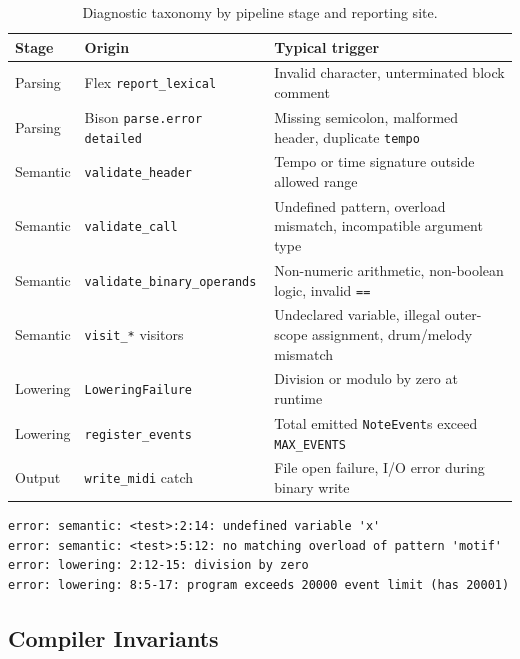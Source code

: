 \begin{table}[htbp]
  \centering
  \renewcommand{\arraystretch}{1.25}
  \begin{tabularx}{\textwidth}{@{}M{1.8cm} M{3.6cm} >{\raggedright\arraybackslash\hspace{0pt}}X@{}}
    \toprule
    \textbf{Stage} & \textbf{Origin} & \textbf{Typical trigger} \\
    \midrule
    Parsing & Flex \texttt{report\_lexical} & Invalid character, unterminated block comment \\
    Parsing & Bison \texttt{parse.error detailed} & Missing semicolon, malformed header, duplicate \texttt{tempo} \\
    Semantic & \texttt{validate\_header} & Tempo or time signature outside allowed range \\
    Semantic & \texttt{validate\_call} & Undefined pattern, overload mismatch, incompatible argument type \\
    Semantic & \texttt{validate\_binary\_operands} & Non-numeric arithmetic, non-boolean logic, invalid \texttt{==} \\
    Semantic & \texttt{visit\_*} visitors & Undeclared variable, illegal outer-scope assignment, drum/melody mismatch \\
    Lowering & \texttt{LoweringFailure} & Division or modulo by zero at runtime \\
    Lowering & \texttt{register\_events} & Total emitted \texttt{NoteEvent}s exceed \texttt{MAX\_EVENTS} \\
    Output & \texttt{write\_midi} catch & File open failure, I/O error during binary write \\
    \bottomrule
  \end{tabularx}
  \caption{Diagnostic taxonomy by pipeline stage and reporting site.}\label{tab:diagnostic-taxonomy}
\end{table}

\begin{lstlisting}[caption={Representative compiler diagnostic messages (format and wording from unit tests).},
label={lst:diagnostic-samples}]
error: semantic: <test>:2:14: undefined variable 'x'
error: semantic: <test>:5:12: no matching overload of pattern 'motif'
error: lowering: 2:12-15: division by zero
error: lowering: 8:5-17: program exceeds 20000 event limit (has 20001)
\end{lstlisting}

\subsection{Compiler Invariants}\label{detail-subsec:compiler-invariants}


